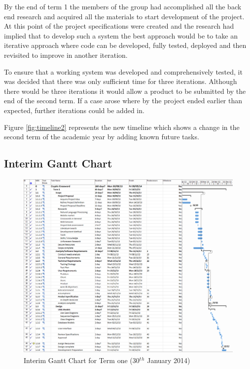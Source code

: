 \begin{landscape}
By the end of term 1 the members of the group had accomplished all the back end
research and acquired all the materials to start development of the project. At
this point of the project  specifications were created and the research had
implied that to develop such a system the best approach would be to take an
iterative approach where code can be developed, fully tested, deployed and then
revisited to improve in another iteration.

To ensure that a working system was developed and comprehensively tested, it was
decided that there was only sufficient time for three iterations. Although there
would be three iterations it would allow a product to be submitted by the end of
the second term. If a case arose where by the project ended earlier than 
expected, further iterations could be added in. 

Figure \ref{fig:timeline2} represents the new timeline which shows a change in 
the second term of the academic year by adding known future tasks.


\newpage 
\subsection{Interim Gantt Chart}

\begin{figure}[H]
  \centering
  \includegraphics[scale=0.35]{images/gant_chart_interim_term1.png}
  \caption{Interim Gantt Chart for Term one (30$^t$$^h$ January 2014)}
  \label{fig:ganttinterimterm1}
\end{figure}


\end{landscape}
